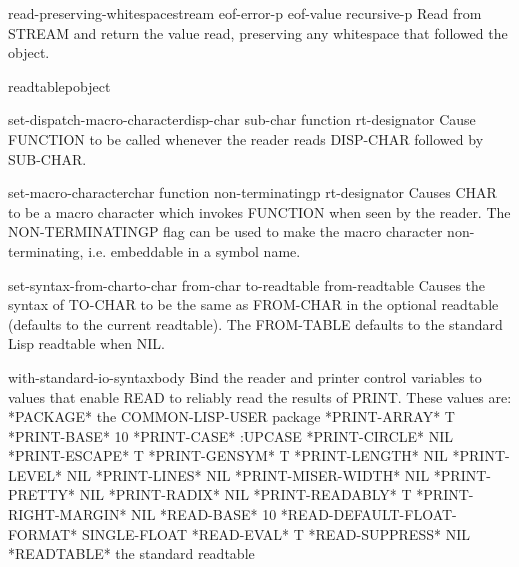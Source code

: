 \begin{function}{read-preserving-whitespace}{\op stream eof-error-p eof-value recursive-p}
  Read from STREAM and return the value read, preserving any whitespace
   that followed the object.
\end{function}

\begin{function}{readtablep}{object}
  
\end{function}

\begin{function}{set-dispatch-macro-character}{disp-char sub-char function \op rt-designator}
  Cause FUNCTION to be called whenever the reader reads DISP-CHAR
   followed by SUB-CHAR.
\end{function}

\begin{function}{set-macro-character}{char function \op non-terminatingp rt-designator}
  Causes CHAR to be a macro character which invokes FUNCTION when seen
   by the reader. The NON-TERMINATINGP flag can be used to make the macro
   character non-terminating, i.e. embeddable in a symbol name.
\end{function}

\begin{function}{set-syntax-from-char}{to-char from-char \op to-readtable from-readtable}
  Causes the syntax of TO-CHAR to be the same as FROM-CHAR in the optional
readtable (defaults to the current readtable). The FROM-TABLE defaults to the
standard Lisp readtable when NIL.
\end{function}

\begin{macro}{with-standard-io-syntax}{\body body}
  Bind the reader and printer control variables to values that enable READ
   to reliably read the results of PRINT. These values are:
       *PACKAGE*                        the COMMON-LISP-USER package
       *PRINT-ARRAY*                    T
       *PRINT-BASE*                     10
       *PRINT-CASE*                     :UPCASE
       *PRINT-CIRCLE*                   NIL
       *PRINT-ESCAPE*                   T
       *PRINT-GENSYM*                   T
       *PRINT-LENGTH*                   NIL
       *PRINT-LEVEL*                    NIL
       *PRINT-LINES*                    NIL
       *PRINT-MISER-WIDTH*              NIL
       *PRINT-PRETTY*                   NIL
       *PRINT-RADIX*                    NIL
       *PRINT-READABLY*                 T
       *PRINT-RIGHT-MARGIN*             NIL
       *READ-BASE*                      10
       *READ-DEFAULT-FLOAT-FORMAT*      SINGLE-FLOAT
       *READ-EVAL*                      T
       *READ-SUPPRESS*                  NIL
       *READTABLE*                      the standard readtable
\end{macro}

